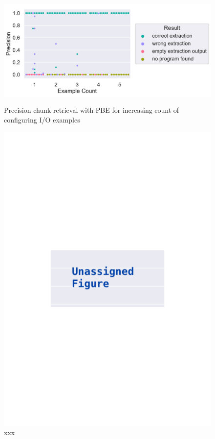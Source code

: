 \documentclass[\myrootdir/main.tex]{subfiles}
\begin{document}
\begin{figure}[htbp]
	\centering
	\begin{minipage}{0.45\textwidth}
		\centering
		\includegraphics[width=\textwidth, clip]{img/big-study/precision-extraction-result-PBE.pdf}
		\caption{Precision chunk retrieval with PBE for increasing count of configuring I/O examples}
		\label{fig:precision-extraction-result-PBE}
	\end{minipage}\hfill
	\begin{minipage}{0.45\textwidth}
		\centering
		\includegraphics[width=\textwidth, clip]{img/big-study/xxx.pdf}
		\caption{xxx}
		\label{fig:xxx}
	\end{minipage}
\end{figure}
\end{document}
